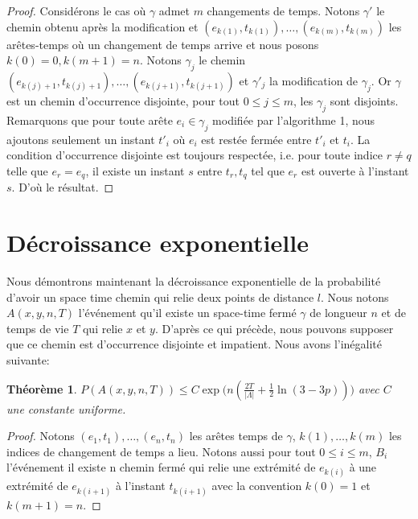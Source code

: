 \documentclass[titlepage,a4paper,12pt]{article}
\newcounter{thm}
\newcounter{algo}
\newtheorem{decexp}[thm]{Théorème}
\begin{document}
\begin{proof}
Considérons le cas où $\gamma$ admet $m$ changements de temps. Notons $\gamma'$ le chemin obtenu après la modification et $(e_{k(1)},t_{k(1)}),\dots,(e_{k(m)},t_{k(m)})$ les arêtes-temps où un changement de temps arrive et nous posons $k(0) = 0,k(m+1)=n$. Notons $\gamma_j$ le chemin $(e_{k(j)+1},t_{k(j)+1}),\dots,(e_{k(j+1)},t_{k(j+1)})$ et $\gamma'_j$ la modification de $\gamma_j$. Or $\gamma$ est un chemin d'occurrence disjointe, pour tout $0\leqslant j \leqslant m$, les $\gamma_j$ sont disjoints. Remarquons que pour toute arête $e_i\in \gamma_j$ modifiée par l'algorithme 1, nous ajoutons seulement un instant $t'_i$ où $e_i$ est restée fermée entre $t'_i$ et $t_i$. La condition d'occurrence disjointe est toujours respectée, i.e. pour toute indice $r \neq q$ telle que $e_r = e_q$, il existe un instant $s$ entre $t_r,t_q$ tel que $e_r$ est ouverte à l'instant $s$. D'où le résultat.
\end{proof}

\section{Décroissance exponentielle}
Nous démontrons maintenant la décroissance exponentielle de la probabilité d'avoir un space time chemin qui relie deux points de distance $l$. Nous notons $A(x,y,n,T)$ l'événement qu'il existe un space-time fermé $\gamma$ de longueur $n$ et de temps de vie $T$ qui relie $x$ et $y$. D'après ce qui précède, nous pouvons supposer que ce chemin est d'occurrence disjointe et impatient. Nous avons l'inégalité suivante:
\begin{decexp} 
$P(A(x,y,n,T))\leqslant C\exp\big(n(\frac{2T}{|\Lambda|}+\frac{1}{2}\ln(3-3p))\big)$ avec $C$ une constante uniforme.
\end{decexp}
\begin{proof}
Notons $(e_1,t_1),\dots,(e_n,t_n)$ les arêtes temps de $\gamma$, $k(1),\dots,k(m)$ les indices de changement de temps a lieu. Notons aussi pour tout $0\leqslant i \leqslant m$, $B_i$ l'événement il existe n chemin fermé qui relie une extrémité de $e_{k(i)}$ à une extrémité de $e_{k(i+1)}$ à l'instant $t_{k(i+1)}$ avec la convention $k(0) = 1$ et $k(m+1)=n$. 
\end{proof}
\end{document}
